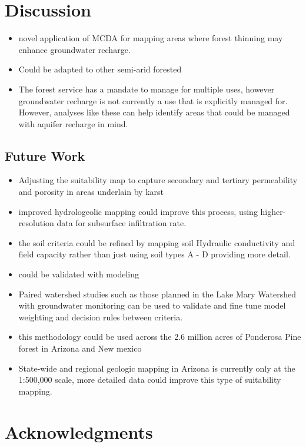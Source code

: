 \documentclass[
  number,
  preprint,
  3p,
  onecolumn]{elsarticle}
\begin{document}
\section{Discussion}\label{discussion}

\begin{itemize}
\item
  novel application of MCDA for mapping areas where forest thinning may
  enhance groundwater recharge.
\item
  Could be adapted to other semi-arid forested
\item
  The forest service has a mandate to manage for multiple uses, however
  groundwater recharge is not currently a use that is explicitly managed
  for. However, analyses like these can help identify areas that could
  be managed with aquifer recharge in mind.
\end{itemize}

\subsection{Future Work}\label{future-work}

\begin{itemize}
\item
  Adjusting the suitability map to capture secondary and tertiary
  permeability and porosity in areas underlain by karst
\item
  improved hydrologeolic mapping could improve this process, using
  higher-resolution data for subsurface infiltration rate.
\item
  the soil criteria could be refined by mapping soil Hydraulic
  conductivity and field capacity rather than just using soil types A -
  D providing more detail.
\item
  could be validated with modeling
\item
  Paired watershed studies such as those planned in the Lake Mary
  Watershed with groundwater monitoring can be used to validate and fine
  tune model weighting and decision rules between criteria.
\item
  this methodology could be used across the 2.6 million acres of
  Ponderosa Pine forest in Arizona and New mexico
\item
  State-wide and regional geologic mapping in Arizona is currently only
  at the 1:500,000 scale, more detailed data could improve this type of
  suitability mapping.
\end{itemize}

\section{Acknowledgments}\label{acknowledgments}
\end{document}
